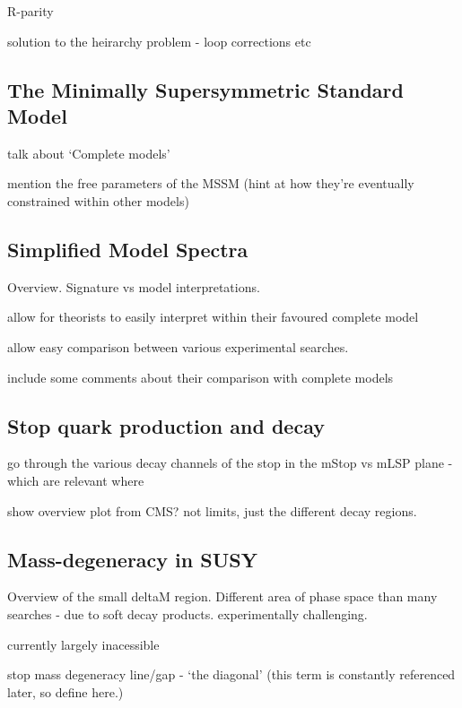 R-parity

solution to the heirarchy problem - loop corrections etc

\subsection{The Minimally Supersymmetric Standard Model}
talk about `Complete models'

mention the free parameters of the MSSM (hint at how they're eventually 
constrained within other models)


\subsection{Simplified Model Spectra}
Overview. Signature vs model interpretations.

allow for theorists to easily interpret within their favoured complete model

allow easy comparison between various experimental searches.

include some comments about their comparison with complete models


\subsection{Stop quark production and decay}
go through the various decay channels of the stop in the mStop vs mLSP plane
- which are relevant where

show overview plot from CMS? not limits, just the different decay regions.

\subsection{Mass-degeneracy in SUSY}
Overview of the small deltaM region. Different area of phase space than many
searches - due to soft decay products. experimentally challenging.

currently largely inacessible

stop mass degeneracy line/gap - `the diagonal' (this term is constantly
referenced later, so define here.)

